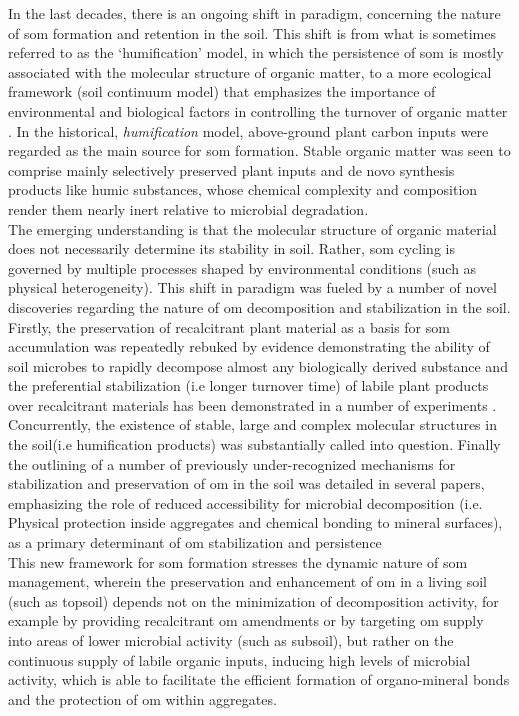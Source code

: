 	 In the last  decades, there is an ongoing shift in  paradigm, concerning the nature of \gls{som} formation and retention in the soil. This shift is from what is sometimes referred to as the ‘humification’ model, in which the persistence of \gls{som} is mostly associated with the molecular structure of organic matter, to a more ecological framework (soil continuum model) that emphasizes the importance of environmental and biological factors in controlling the turnover of organic matter \citep{lehmann2015}. In the historical, \textit{humification} model, above-ground plant carbon inputs were regarded as the main source for \gls{som} formation. Stable organic matter was seen to comprise mainly selectively preserved plant inputs and de novo synthesis products like humic substances, whose chemical complexity and composition render them nearly inert relative to microbial degradation.\\
	 The emerging understanding is that the molecular structure of organic material does not necessarily determine its stability in soil. Rather, \gls{som} cycling is governed by multiple processes shaped by environmental conditions (such as physical heterogeneity)\citep{schmidt2011c}. This shift in paradigm was fueled by a number of novel discoveries regarding the nature of \gls{om} decomposition and stabilization in the soil. Firstly, the preservation of recalcitrant plant material as a basis for \gls{som} accumulation was repeatedly rebuked by evidence demonstrating the ability of soil microbes to rapidly decompose almost any biologically derived substance \citep{dungait2012, marschner2008} and the preferential stabilization (i.e longer turnover time) of labile plant products over recalcitrant materials has been demonstrated in a number of experiments \citep{cotrufo2013, kleber2011}. Concurrently, the existence of stable, large and complex molecular structures in the soil(i.e humification products) was substantially called into question\citep{kleber2010}. Finally the outlining of a number of previously under-recognized mechanisms for stabilization and preservation of \gls{om} in the soil was detailed in several papers, emphasizing the role of reduced accessibility for microbial decomposition (i.e. Physical protection inside aggregates and chemical bonding to mineral surfaces), as a primary determinant of \gls{om} stabilization and persistence\citep{lutzow2006, lutzow2008, ekschmitt2008}\.\\
	 This new framework for \gls{som} formation stresses the dynamic nature of \gls{som} management, wherein the preservation and enhancement of \gls{om} in a living soil (such as topsoil) depends not on the minimization of decomposition activity, for example by providing recalcitrant \gls{om} amendments or by targeting \gls{om} supply into areas of lower microbial activity (such as subsoil), but rather on the continuous supply of labile organic inputs, inducing high levels of microbial activity, which is able to facilitate the efficient formation of organo-mineral bonds and the protection of \gls{om} within aggregates\citep{dungait2012,barre2016,basler2015}.


